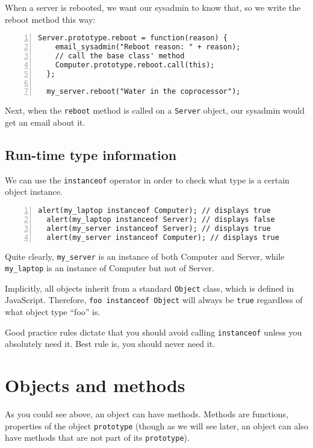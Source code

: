 When a server is rebooted, we want our sysadmin to know that, so we write the
reboot method this way:

\begin{lstlisting}[nolol,name=ObjectSample1,numbers=left]
  Server.prototype.reboot = function(reason) {
    email_sysadmin("Reboot reason: " + reason);
    // call the base class' method
    Computer.prototype.reboot.call(this);
  };

  my_server.reboot("Water in the coprocessor");
\end{lstlisting}

Next, when the \lstinline{reboot} method is called on a \lstinline{Server}
object, our sysadmin would get an email about it.

\subsection{Run-time type information}

We can use the \lstinline{instanceof} operator in order to check what type is a
certain object instance.

\begin{lstlisting}[nolol,name=ObjectSample1,numbers=left]
  alert(my_laptop instanceof Computer); // displays true
  alert(my_laptop instanceof Server); // displays false
  alert(my_server instanceof Server); // displays true
  alert(my_server instanceof Computer); // displays true
\end{lstlisting}

Quite clearly, \lstinline{my_server} is an instance of both Computer and
Server, while \lstinline{my_laptop} is an instance of Computer but not of
Server.

Implicitly, all objects inherit from a standard \lstinline{Object} class, which
is defined in JavaScript.  Therefore, \lstinline{foo instanceof Object} will
always be \lstinline{true} regardless of what object type “foo” is.

Good practice rules dictate that you should avoid calling
\lstinline{instanceof} unless you absolutely need it.  Best rule is, you should
never need it.

\section{Objects and methods}

As you could see above, an object can have methods.  Methods are functions,
properties of the object \lstinline{prototype} (though as we will see later, an
object can also have methods that are not part of its \lstinline{prototype}).

